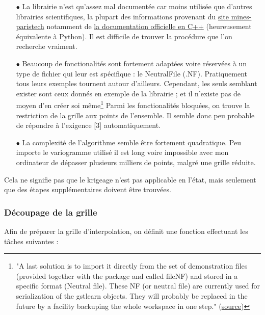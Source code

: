 \documentclass[12pt]{article}
\begin{document}
    \begin{enumerate}
        \item[$\bullet$] La librairie n'est qu'assez mal documentée car moins utilisée que d'autres librairies scientifiques, la plupart des informations provenant du \href{https://soft.mines-paristech.fr/gstlearn/courses-latest/python/}{site mines-paristech} notamment de \href{https://soft.mines-paristech.fr/gstlearn/doxygen-latest/}{la documentation officielle en C++} (heureusement équivalente à Python). Il est difficile de trouver la procédure que l'on recherche vraiment.
        \item[$\bullet$] Beaucoup de fonctionalités sont fortement adaptées voire réservées à un type de fichier qui leur est spécifique : le NeutralFile (.NF). Pratiquement tous leurs exemples tournent autour d'ailleurs. Cependant, les seuls semblant exister sont ceux donnés en exemple de la librairie ; et il n'existe pas de moyen d'en créer soi même\footnote{"A last solution is to import it directly from the set of demonstration files (provided together with the package and called fileNF) and stored in a specific format (Neutral file). These NF (or neutral file) are currently used for serialization of the gstlearn objects. They will probably be replaced in the future by a facility backuping the whole workspace in one step." (\href{https://soft.mines-paristech.fr/gstlearn/1.3.1/courses/r/02_Db.html}{source}) } Parmi les fonctionalités bloquées, on trouve la restriction de la grille aux points de l'ensemble. Il semble donc peu probable de répondre à l'exigence [3] automatiquement.
        \item[$\bullet$] La complexité de l'algorithme semble être fortement quadratique. Peu importe le variogramme utilisé il est long voire impossible avec mon ordinateur de dépasser plusieurs milliers de points, malgré une grille réduite.
    \end{enumerate}

    Cela ne signifie pas que le krigeage n'est pas applicable en l'état, mais seulement que des étapes supplémentaires doivent être trouvées.

\subsubsection{Découpage de la grille}

    Afin de préparer la grille d'interpolation, on définit une fonction effectuant les tâches suivantes :
\end{document}
